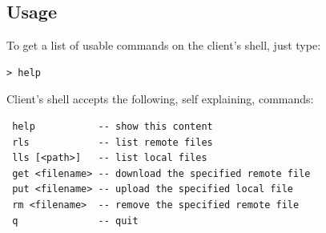\documentclass[a4paper,12pt]{article}
\begin{document}
\subsection{Usage}
To get a list of usable commands on the client's shell, just type:
\begin{verbatim}
> help
\end{verbatim}

Client's shell accepts the following, self explaining, commands:
\begin{verbatim}
 help           -- show this content
 rls            -- list remote files
 lls [<path>]   -- list local files
 get <filename> -- download the specified remote file
 put <filename> -- upload the specified local file
 rm <filename>  -- remove the specified remote file
 q              -- quit
\end{verbatim}
\end{document}
